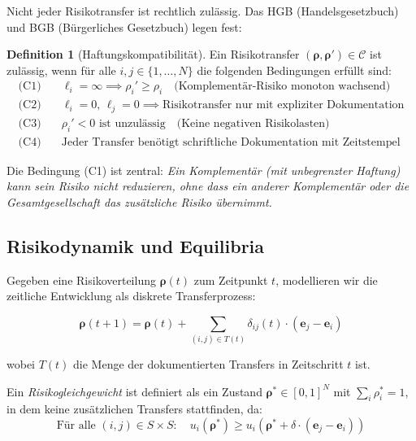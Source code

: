 \documentclass[a4paper, 12pt, twoside, openright]{report}
\theoremstyle{definition}
\newtheorem{definition}[theorem]{Definition}
\theoremstyle{definition}
\begin{document}
Nicht jeder Risikotransfer ist rechtlich zulässig. Das HGB (Handelsgesetzbuch) und BGB (Bürgerliches Gesetzbuch) legen fest:

\begin{definition}[Haftungskompatibilität]
Ein Risikotransfer $({\boldsymbol{\rho}}, {\boldsymbol{\rho}}') \in \mathcal{C}$ ist zulässig, wenn für alle $i,j \in \{1,\ldots,N\}$ die folgenden Bedingungen erfüllt sind:
\begin{align}
\text{(C1)} \quad &\ell_i = \infty \implies \rho_i' \geq \rho_i \quad \text{(Komplementär-Risiko monoton wachsend)}\\
\text{(C2)} \quad &\ell_i = 0, \, \ell_j = 0 \implies \text{Risikotransfer nur mit expliziter Dokumentation}\\
\text{(C3)} \quad &\rho_i' < 0 \text{ ist unzulässig} \quad \text{(Keine negativen Risikolasten)}\\
\text{(C4)} \quad &\text{Jeder Transfer benötigt schriftliche Dokumentation mit Zeitstempel}
\end{align}
\end{definition}

Die Bedingung (C1) ist zentral: \emph{Ein Komplementär (mit unbegrenzter Haftung) kann sein Risiko nicht reduzieren, ohne dass ein anderer Komplementär oder die Gesamtgesellschaft das zusätzliche Risiko übernimmt.}

\subsection{Risikodynamik und Equilibria}

Gegeben eine Risikoverteilung $\boldsymbol{\rho}(t)$ zum Zeitpunkt $t$, modellieren wir die zeitliche Entwicklung als diskrete Transferprozess:

\begin{equation}
\boldsymbol{\rho}(t+1) = \boldsymbol{\rho}(t) + \sum_{(i,j) \in T(t)} \delta_{ij}(t) \cdot (\mathbf{e}_j - \mathbf{e}_i)
\end{equation}

wobei $T(t)$ die Menge der dokumentierten Transfers in Zeitschritt $t$ ist.

Ein \emph{Risikogleichgewicht} ist definiert als ein Zustand $\boldsymbol{\rho}^* \in [0,1]^N$ mit $\sum_i \rho_i^* = 1$, in dem keine zusätzlichen Transfers stattfinden, da:
\begin{equation}
\text{Für alle } (i,j) \in S \times S: \quad u_i(\boldsymbol{\rho}^*) \geq u_i(\boldsymbol{\rho}^* + \delta \cdot (\mathbf{e}_j - \mathbf{e}_i))
\end{equation}
\end{document}
